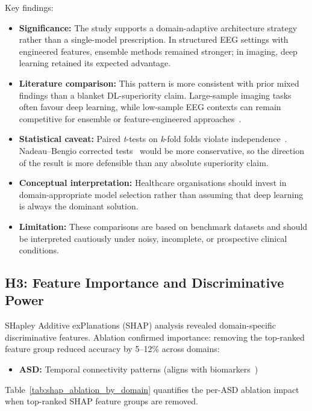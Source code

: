 \noindent Key findings:

\begin{itemize}
    \item \textbf{Significance:} The study supports a domain-adaptive architecture strategy rather than a single-model prescription. In structured EEG settings with engineered features, ensemble methods remained stronger; in imaging, deep learning retained its expected advantage.
    \item \textbf{Literature comparison:} This pattern is more consistent with prior mixed findings than a blanket DL-superiority claim. Large-sample imaging tasks often favour deep learning, while low-sample EEG contexts can remain competitive for ensemble or feature-engineered approaches~\cite{lecun2015deep,craik2019eeg}.
    \item \textbf{Statistical caveat:} Paired \textit{t}-tests on \textit{k}-fold folds violate independence~\cite{dietterich1998approximate}. Nadeau--Bengio corrected tests~\cite{nadeau2003inference} would be more conservative, so the direction of the result is more defensible than any absolute superiority claim.
    \item \textbf{Conceptual interpretation:} Healthcare organisations should invest in domain-appropriate model selection rather than assuming that deep learning is always the dominant solution.
    \item \textbf{Limitation:} These comparisons are based on benchmark datasets and should be interpreted cautiously under noisy, incomplete, or prospective clinical conditions.
\end{itemize}

\subsection{H3: Feature Importance and Discriminative Power}

SHapley Additive exPlanations (SHAP) analysis revealed domain-specific discriminative features. Ablation confirmed importance: removing the top-ranked feature group reduced accuracy by 5--12\% across domains:

\begin{itemize}
    \item \textbf{ASD:} Temporal connectivity patterns (aligns with biomarkers~\cite{bosl2018eeg})
\end{itemize}

Table~\ref{tab:shap_ablation_by_domain} quantifies the per-ASD ablation impact when top-ranked SHAP feature groups are removed.

